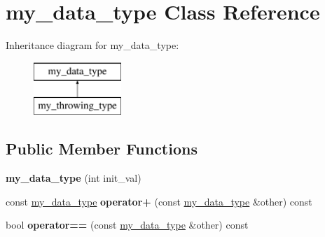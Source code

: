 \hypertarget{classmy__data__type}{}\section{my\+\_\+data\+\_\+type Class Reference}
\label{classmy__data__type}
Inheritance diagram for my\+\_\+data\+\_\+type\+:\begin{figure}[H]
\begin{center}
\leavevmode
\includegraphics[height=2.000000cm]{classmy__data__type}
\end{center}
\end{figure}
\subsection*{Public Member Functions}
\begin{DoxyCompactItemize}
\item 
\hypertarget{classmy__data__type_a2367deec0de030fed88de4e798a630ae}{}{\bfseries my\+\_\+data\+\_\+type} (int init\+\_\+val)\label{classmy__data__type_a2367deec0de030fed88de4e798a630ae}

\item 
\hypertarget{classmy__data__type_aa6bd65766bd6bc8bad51477a6dd7fbbb}{}const \hyperlink{classmy__data__type}{my\+\_\+data\+\_\+type} {\bfseries operator+} (const \hyperlink{classmy__data__type}{my\+\_\+data\+\_\+type} \&other) const \label{classmy__data__type_aa6bd65766bd6bc8bad51477a6dd7fbbb}

\item 
\hypertarget{classmy__data__type_ac05ace121b97d5192f0685a744c4aa21}{}bool {\bfseries operator==} (const \hyperlink{classmy__data__type}{my\+\_\+data\+\_\+type} \&other) const \label{classmy__data__type_ac05ace121b97d5192f0685a744c4aa21}

\end{DoxyCompactItemize}
